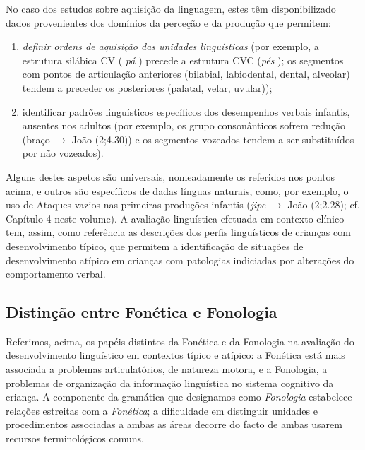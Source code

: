 \documentclass[output=paper]{LSP/langsci}
\begin{document}
No caso dos estudos sobre aquisição da linguagem, estes têm disponibilizado dados provenientes dos domínios da perceção e da produção que permitem: 

\begin{enumerate}[label=(\roman*)]
\item \textit{definir ordens de aquisição das unidades linguísticas} (por exemplo, a estrutura silábica CV ( \textit{pá} \textipa{[\textprimstress pa]}) precede a estrutura CVC (\textit{pés} ); os segmentos com pontos de articulação anteriores (bilabial, labiodental, dental, alveolar) tendem a preceder os posteriores (palatal, velar, uvular)); 

\item identificar padrões linguísticos específicos dos desempenhos verbais infantis, ausentes nos adultos (por exemplo, os grupo consonânticos sofrem redução (braço  $\rightarrow$  João (2;4.30)) e os segmentos vozeados tendem a ser substituídos por não vozeados). 
\end{enumerate}

Alguns destes aspetos são universais, nomeadamente os referidos nos pontos acima, e outros são específicos de dadas línguas naturais, como, por exemplo, o uso de Ataques vazios nas primeiras produções infantis (\textit{jipe} \textipa{[Zíp1]} $\rightarrow$ \textipa{[ípi]} João (2;2.28); cf. Capítulo 4 neste volume). A avaliação linguística efetuada em contexto clínico tem, assim, como referência as descrições dos perfis linguísticos de crianças com desenvolvimento típico, que permitem a identificação de situações de desenvolvimento atípico em crianças com patologias indiciadas por alterações do comportamento verbal. 

\subsection{Distinção entre Fonética e Fonologia}
\label{subsec:lousada_distincao}

Referimos, acima, os papéis distintos da Fonética e da Fonologia na avaliação do desenvolvimento linguístico em contextos típico e atípico: a Fonética está mais associada a problemas articulatórios, de natureza motora, e a Fonologia, a problemas de organização da informação linguística no sistema cognitivo da criança. A componente da gramática que designamos como \textit{Fonologia} estabelece relações estreitas com a \textit{Fonética}; a dificuldade em distinguir unidades e procedimentos associadas a ambas as áreas decorre do facto de ambas usarem recursos terminológicos comuns. 
\end{document}
